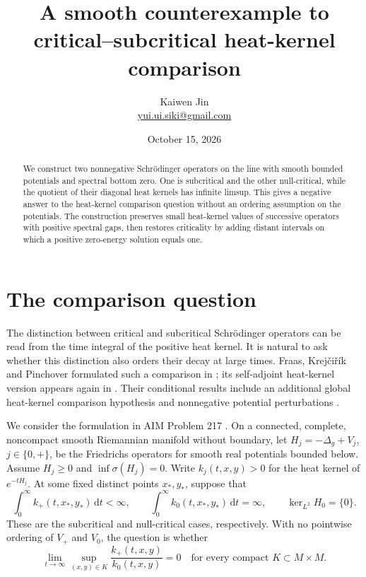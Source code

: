 \documentclass[11pt,a4paper]{article}
\title{A smooth counterexample to critical--subcritical heat-kernel comparison}
\author{Kaiwen Jin\\\small\href{mailto:yui.ui.siki@gmail.com}{yui.ui.siki@gmail.com}}
\date{October 15, 2026}
\newcommand{\dd}{\,\mathrm d}
\newcommand{\spec}{\sigma}
\begin{document}
\maketitle
\begin{abstract}
We construct two nonnegative Schr\"odinger operators on the line with smooth
bounded potentials and spectral bottom zero. One is subcritical and the other
null-critical, while the quotient of their diagonal heat kernels has infinite
limsup. This gives a negative answer to the heat-kernel comparison question
without an ordering assumption on the potentials. The construction preserves
small heat-kernel values of successive operators with positive spectral gaps,
then restores criticality by adding distant intervals on which a positive
zero-energy solution equals one.
\end{abstract}

\section{The comparison question}

The distinction between critical and subcritical Schr\"odinger operators can be
read from the time integral of the positive heat kernel. It is natural to ask
whether this distinction also orders their decay at large times. Fraas,
Krej\v{c}i\v{r}\'ik and Pinchover formulated such a comparison in
\cite[Conjecture 1]{FKP}; its self-adjoint heat-kernel version appears again in
\cite[Conjecture 2]{Krejcirik}. Their conditional results include an additional
global heat-kernel comparison hypothesis \cite[Theorem 3.1]{FKP} and
nonnegative potential perturbations \cite[Corollary 1]{FKP}.

We consider the formulation in AIM Problem 217 \cite{AIM217}. On a connected,
complete, noncompact smooth Riemannian manifold without boundary, let
$H_j=-\Delta_g+V_j$, $j\in\{0,+\}$, be the Friedrichs operators for smooth
real potentials bounded below. Assume $H_j\geq0$ and $\inf\spec(H_j)=0$.
Write $k_j(t,x,y)>0$ for the heat kernel of $e^{-tH_j}$. At some fixed
distinct points $x_*,y_*$, suppose that
\begin{equation}\label{eq:original-integrals}
 \int_0^\infty k_+(t,x_*,y_*)\dd t<\infty,
 \qquad
 \int_0^\infty k_0(t,x_*,y_*)\dd t=\infty,
 \qquad \ker_{L^2}H_0=\{0\}.
\end{equation}
These are the subcritical and null-critical cases, respectively. With no
pointwise ordering of $V_+$ and $V_0$, the question is whether
\begin{equation}\label{eq:question}
 \lim_{t\to\infty}\sup_{(x,y)\in K}
       \frac{k_+(t,x,y)}{k_0(t,x,y)}=0
 \quad\text{for every compact }K\subset M\times M.
\end{equation}
\end{document}
